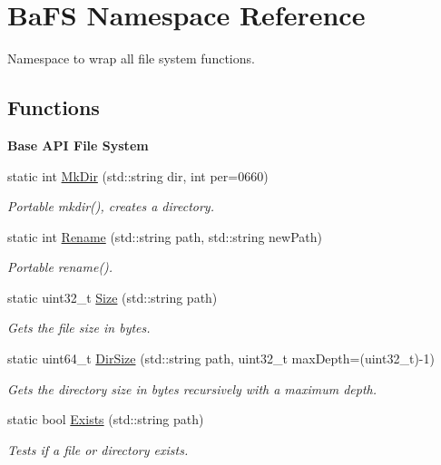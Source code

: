 \hypertarget{namespaceBaFS}{}\section{Ba\+FS Namespace Reference}
\label{namespaceBaFS}


Namespace to wrap all file system functions.  


\subsection*{Functions}
\begin{Indent}{\bf Base A\+PI File System}\par
\begin{DoxyCompactItemize}
\item 
static int \hyperlink{namespaceBaFS_a9e6346a9784d4de1dbda3c79ef8bb72b}{Mk\+Dir} (std\+::string dir, int per=0660)
\begin{DoxyCompactList}\small\item\em Portable mkdir(), creates a directory. \end{DoxyCompactList}\item 
static int \hyperlink{namespaceBaFS_ad729f83dfe589df3058696c6db6452c9}{Rename} (std\+::string path, std\+::string new\+Path)
\begin{DoxyCompactList}\small\item\em Portable rename(). \end{DoxyCompactList}\item 
static uint32\+\_\+t \hyperlink{namespaceBaFS_a526ea62172fcaa4003dd437863c6604c}{Size} (std\+::string path)
\begin{DoxyCompactList}\small\item\em Gets the file size in bytes. \end{DoxyCompactList}\item 
static uint64\+\_\+t \hyperlink{namespaceBaFS_aafa79b524a4f13b6531cf79b1f73774e}{Dir\+Size} (std\+::string path, uint32\+\_\+t max\+Depth=(uint32\+\_\+t)-\/1)
\begin{DoxyCompactList}\small\item\em Gets the directory size in bytes recursively with a maximum depth. \end{DoxyCompactList}\item 
static bool \hyperlink{namespaceBaFS_a73d165c90a00491cfe0b9ce3b5fe5c58}{Exists} (std\+::string path)
\begin{DoxyCompactList}\small\item\em Tests if a file or directory exists. \end{DoxyCompactList}\end{DoxyCompactItemize}
\end{Indent}


